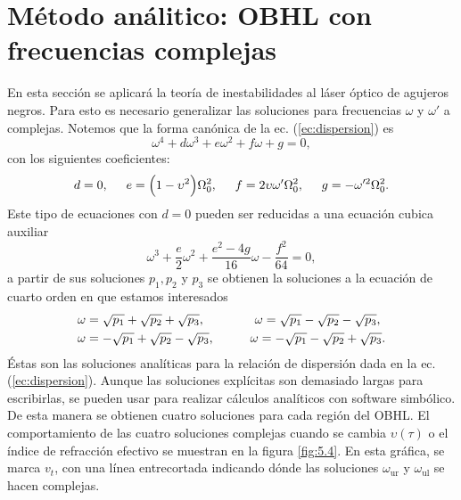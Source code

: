 \section{M\'{e}todo an\'{a}litico: OBHL con frecuencias complejas}
En esta secci\'{o}n se aplicar\'{a} la teoría de inestabilidades al láser \'{o}ptico de agujeros negros. Para esto es necesario generalizar las soluciones para frecuencias $\omega$ y $\omega'$ a complejas. Notemos que la forma can\'{o}nica de la ec. (\ref{ec:dispersion}) es
\begin{equation}
\omega^4+d\omega^3+e\omega^2+f\omega+g=0,
\end{equation}
con los siguientes coeficientes:
\begin{align}
d=0, \hspace{0.5cm} e=\Bigl(1-\upsilon^2\Bigr)\Omega_0^2, \hspace{0.5cm} f=2\upsilon\omega' \Omega_0^2, \hspace{0.5cm} g=-\omega'^2\Omega_0^2.
\end{align}
Este tipo de ecuaciones con $d=0$ pueden ser reducidas a una ecuaci\'{o}n cubica auxiliar
\begin{equation}
\omega^3+\frac{e}{2}\omega^2+\frac{e^2-4g}{16}\omega-\frac{f^2}{64}=0,
\end{equation}
a partir de sus soluciones $p_1,p_2$ y $p_3$ se obtienen la soluciones a la ecuaci\'{o}n de cuarto orden en que estamos interesados
\begin{align*}
\omega&=\sqrt{p_1}+\sqrt{p_2}+\sqrt{p_3}, \hspace{1.4cm} \omega=\sqrt{p_1}-\sqrt{p_2}-\sqrt{p_3},\\
\omega&=-\sqrt{p_1}+\sqrt{p_2}-\sqrt{p_3}, \hspace{1cm} \omega=-\sqrt{p_1}-\sqrt{p_2}+\sqrt{p_3}.
\end{align*}
\'{E}stas son las soluciones anal\'iticas para la relaci\'{o}n de dispersi\'{o}n dada en la ec. (\ref{ec:dispersion}). Aunque las soluciones explícitas son demasiado largas para escribirlas, se pueden usar para realizar cálculos analíticos con software simb\'olico. De esta manera se obtienen cuatro soluciones para cada regi\'{o}n del OBHL. El comportamiento de las cuatro soluciones complejas cuando se cambia $\upsilon(\tau)$ o el \'{i}ndice de refracci\'{o}n efectivo se muestran en la figura \ref{fig:5.4}. En esta gr\'{a}fica, se marca $v_t$, con una l\'{i}nea entrecortada indicando d\'{o}nde las soluciones $\omega_{\text{ur}}$ y $\omega_{\text{ul}}$ se hacen complejas.\\
